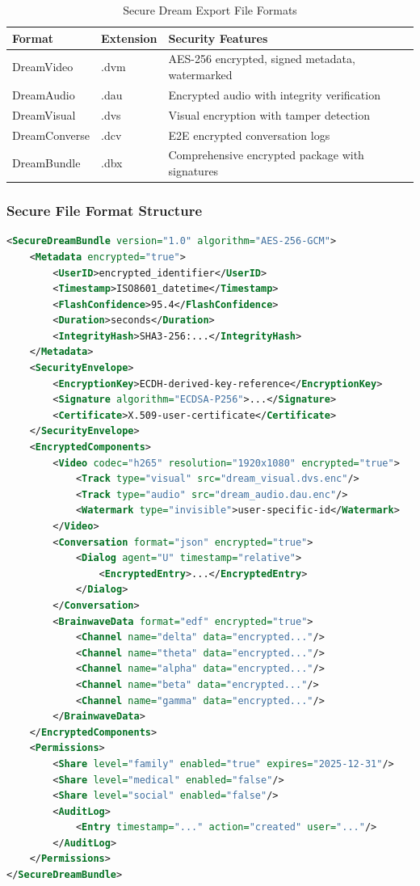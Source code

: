 \documentclass[12pt,a4paper]{article}
\begin{document}
\begin{table}[h]
\centering
\begin{tabular}{|l|l|p{6cm}|}
\hline
\textbf{Format} & \textbf{Extension} & \textbf{Security Features} \\
\hline
DreamVideo & .dvm & AES-256 encrypted, signed metadata, watermarked \\
\hline
DreamAudio & .dau & Encrypted audio with integrity verification \\
\hline
DreamVisual & .dvs & Visual encryption with tamper detection \\
\hline
DreamConverse & .dcv & E2E encrypted conversation logs \\
\hline
DreamBundle & .dbx & Comprehensive encrypted package with signatures \\
\hline
\end{tabular}
\caption{Secure Dream Export File Formats}
\end{table}

\subsubsection{Secure File Format Structure}

\begin{lstlisting}[language=xml, caption=Secure DreamBundle (.dbx) Structure]
<SecureDreamBundle version="1.0" algorithm="AES-256-GCM">
    <Metadata encrypted="true">
        <UserID>encrypted_identifier</UserID>
        <Timestamp>ISO8601_datetime</Timestamp>
        <FlashConfidence>95.4</FlashConfidence>
        <Duration>seconds</Duration>
        <IntegrityHash>SHA3-256:...</IntegrityHash>
    </Metadata>
    <SecurityEnvelope>
        <EncryptionKey>ECDH-derived-key-reference</EncryptionKey>
        <Signature algorithm="ECDSA-P256">...</Signature>
        <Certificate>X.509-user-certificate</Certificate>
    </SecurityEnvelope>
    <EncryptedComponents>
        <Video codec="h265" resolution="1920x1080" encrypted="true">
            <Track type="visual" src="dream_visual.dvs.enc"/>
            <Track type="audio" src="dream_audio.dau.enc"/>
            <Watermark type="invisible">user-specific-id</Watermark>
        </Video>
        <Conversation format="json" encrypted="true">
            <Dialog agent="U" timestamp="relative">
                <EncryptedEntry>...</EncryptedEntry>
            </Dialog>
        </Conversation>
        <BrainwaveData format="edf" encrypted="true">
            <Channel name="delta" data="encrypted..."/>
            <Channel name="theta" data="encrypted..."/>
            <Channel name="alpha" data="encrypted..."/>
            <Channel name="beta" data="encrypted..."/>
            <Channel name="gamma" data="encrypted..."/>
        </BrainwaveData>
    </EncryptedComponents>
    <Permissions>
        <Share level="family" enabled="true" expires="2025-12-31"/>
        <Share level="medical" enabled="false"/>
        <Share level="social" enabled="false"/>
        <AuditLog>
            <Entry timestamp="..." action="created" user="..."/>
        </AuditLog>
    </Permissions>
</SecureDreamBundle>
\end{lstlisting}
\end{document}
